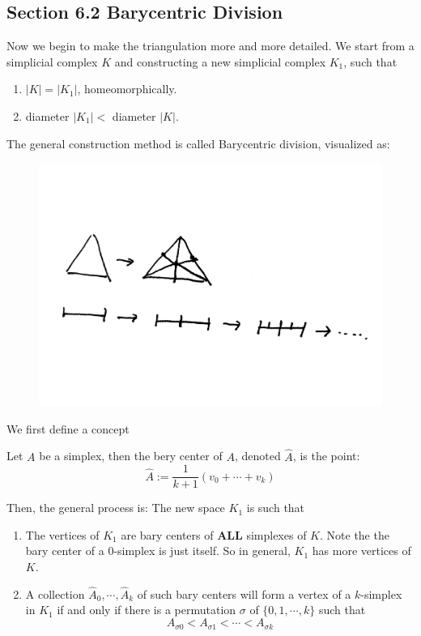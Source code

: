 \subsection{Section 6.2 Barycentric Division}
\label{sec:Barycentric-Division}
Now we begin to make the triangulation more and more detailed. We
start from a simplicial complex $K$ and constructing a new simplicial
complex $K_1$, such that
\begin{enumerate}
    \item $|K|=|K_1|$, homeomorphically.
    \item diameter $|K_1|<$ diameter $|K|$.
\end{enumerate}
The general construction method is called Barycentric division,
visualized as:
\begin{figure}[H]
    \centering
    \includegraphics[width=0.6\linewidth]{pics/ch6-scanned-notes-1/8.pdf}
\end{figure}
We first define a concept
\begin{defi}
Let $A$ be a simplex, then the bery center of $A$, denoted $\hat{A}$,
is the point:
\begin{equation}
    \hat{A}:= \frac{1}{k+1}(v_0+\cdots+v_k)
\end{equation}
\end{defi}
Then, the general process is:
The new space $K_1$ is such that
\begin{enumerate}
    \item The vertices of $K_1$ are bary centers of \textbf{ALL}
        simplexes of $K$. Note the the bary center of a $0$-simplex
        is just itself. So in general, $K_1$ has more vertices of
        $K$.
    \item A collection $\hat{A}_0,\cdots,\hat{A}_k$ of such bary
        centers will form a vertex of a $k$-simplex in $K_1$ if and
        only if there is a permutation $\sigma$ of $\{0,1,\cdots,k\}$
        such that
        \begin{equation}
            A_{\sigma{0}}< A_{\sigma{1}} < \cdots < A_{\sigma{k}}
        \end{equation}
\end{enumerate}
